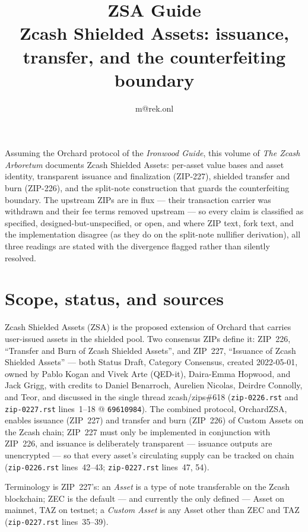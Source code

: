 \documentclass[11pt,a4paper]{article}
\title{\textbf{\Huge ZSA Guide}\\[6pt]\large Zcash Shielded Assets: issuance, transfer, and the counterfeiting boundary}
\author{m@rek.onl}
\date{}
\theoremstyle{definition}
\renewenvironment{abstract}{%
  \small\begin{center}{\bfseries\abstractname}\end{center}\medskip\noindent\ignorespaces
}{\par\medskip}
\begin{document}
\maketitle
\thispagestyle{empty}
\begin{abstract}
Assuming the Orchard protocol of the \emph{Ironwood Guide}, this volume of
\emph{The Zcash Arboretum} documents Zcash Shielded Assets: per-asset value
bases and asset identity, transparent issuance and finalization (ZIP-227),
shielded transfer and burn (ZIP-226), and the split-note construction that
guards the counterfeiting boundary. The upstream ZIPs are in flux --- their
transaction carrier was withdrawn and their fee terms removed upstream --- so
every claim is classified as specified, designed-but-unspecified, or open,
and where ZIP text, fork text, and the implementation disagree (as they do on
the split-note nullifier derivation), all three readings are stated with the
divergence flagged rather than silently resolved.
\end{abstract}
\clearpage
\tableofcontents
\clearpage
\section{Scope, status, and sources}\label{sec:zsa-scope}

Zcash Shielded Assets (ZSA) is the proposed extension of Orchard that carries
user-issued assets in the shielded pool. Two consensus ZIPs define it:
ZIP~226, ``Transfer and Burn of Zcash Shielded Assets'', and ZIP~227,
``Issuance of Zcash Shielded Assets'' --- both Status Draft, Category
Consensus, created 2022-05-01, owned by Pablo Kogan and Vivek Arte (QED-it),
Daira-Emma Hopwood, and Jack Grigg, with credits to Daniel Benarroch,
Aurelien Nicolas, Deirdre Connolly, and Teor, and discussed in the single
thread zcash/zips\#618 (\texttt{zip-0226.rst} and \texttt{zip-0227.rst}
lines~1--18 @ \texttt{69610984}). The combined protocol, OrchardZSA, enables
issuance (ZIP~227) and transfer and burn (ZIP~226) of Custom Assets on the
Zcash chain; ZIP~227 must only be implemented in conjunction with ZIP~226, and
issuance is deliberately transparent --- issuance outputs are unencrypted ---
so that every asset's circulating supply can be tracked on chain
(\texttt{zip-0226.rst} lines~42--43; \texttt{zip-0227.rst} lines~47, 54).

Terminology is ZIP~227's: an \emph{Asset} is a type of note transferable on
the Zcash blockchain; ZEC is the default --- and currently the only defined ---
Asset on mainnet, TAZ on testnet; a \emph{Custom Asset} is any Asset other
than ZEC and TAZ (\texttt{zip-0227.rst} lines~35--39).
\end{document}
